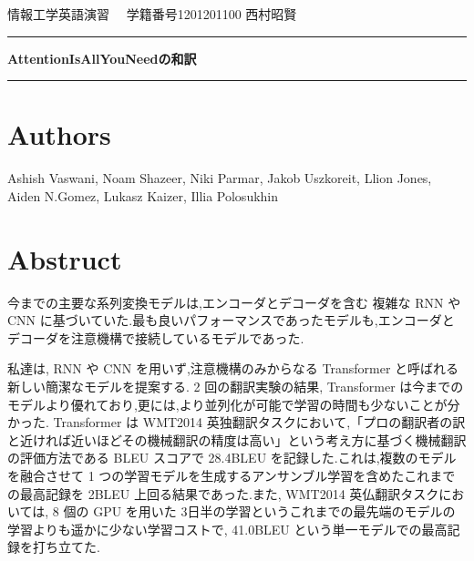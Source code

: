 \documentclass{jarticle}     %
\begin{document}
  \noindent
  \onecolumn
  \hspace{1em}

  情報工学英語演習
  \hfill
  \ \  学籍番号1201201100 西村昭賢 

  \vspace{2mm}
  \hrule
  \begin{center}
  {\Large \bf AttentionIsAllYouNeedの和訳}
  \end{center}
  \hrule
  \vspace{3mm}

\section*{Authors}
Ashish Vaswani, Noam Shazeer, Niki Parmar, Jakob Uszkoreit, Llion Jones, Aiden N.Gomez, Lukasz Kaizer, Illia Polosukhin\cite{Transformer}

\section*{Abstruct}
今までの主要な系列変換モデルは,エンコーダとデコーダを含む
複雑な RNN や CNN に基づいていた.最も良いパフォーマンスであったモデルも,エンコーダとデコーダを注意機構で接続しているモデルであった.\par
私達は, RNN や CNN を用いず,注意機構のみからなる Transformer と呼ばれる新しい簡潔なモデルを提案する. 2 回の翻訳実験の結果, Transformer は今までのモデルより優れており,更には,より並列化が可能で学習の時間も少ないことが分かった.
Transformer は WMT2014 英独翻訳タスクにおいて,「プロの翻訳者の訳と近ければ近いほどその機械翻訳の精度は高い」という考え方に基づく機械翻訳の評価方法である BLEU スコア\cite{BLEU}で 28.4BLEU を記録した.これは,複数のモデルを融合させて 1 つの学習モデルを生成するアンサンブル学習\cite{ensemble}を含めたこれまでの最高記録を 2BLEU 上回る結果であった.また, WMT2014 英仏翻訳タスクにおいては, 8 個の GPU を用いた 3日半の学習というこれまでの最先端のモデルの学習よりも遥かに少ない学習コストで, 41.0BLEU という単一モデルでの最高記録を打ち立てた.

\end{document}
